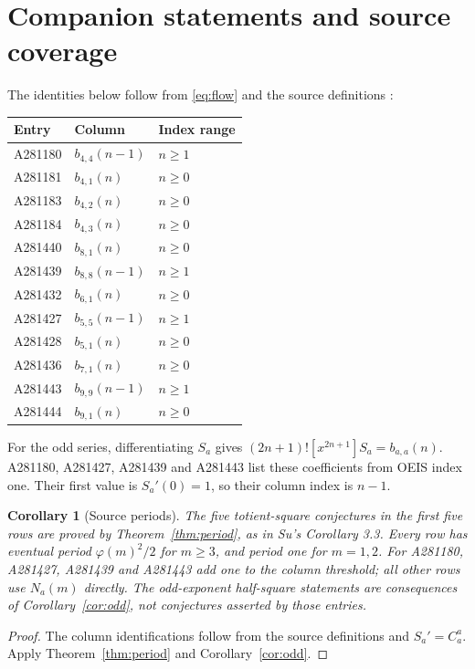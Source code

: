 \documentclass[11pt]{article}
\newtheorem{corollary}{Corollary}
\begin{document}
\section{Companion statements and source coverage}
The identities below follow from \eqref{eq:flow} and the source definitions
\cite{oeis180,oeis181,oeis183,oeis184,oeis440,oeiscompanions}:
\begin{center}
\begin{tabular}{lll}
\toprule
Entry & Column & Index range\\
\midrule
A281180 & $b_{4,4}(n-1)$ & $n\ge1$\\
A281181 & $b_{4,1}(n)$ & $n\ge0$\\
A281183 & $b_{4,2}(n)$ & $n\ge0$\\
A281184 & $b_{4,3}(n)$ & $n\ge0$\\
A281440 & $b_{8,1}(n)$ & $n\ge0$\\
A281439 & $b_{8,8}(n-1)$ & $n\ge1$\\
A281432 & $b_{6,1}(n)$ & $n\ge0$\\
A281427 & $b_{5,5}(n-1)$ & $n\ge1$\\
A281428 & $b_{5,1}(n)$ & $n\ge0$\\
A281436 & $b_{7,1}(n)$ & $n\ge0$\\
A281443 & $b_{9,9}(n-1)$ & $n\ge1$\\
A281444 & $b_{9,1}(n)$ & $n\ge0$\\
\bottomrule
\end{tabular}
\end{center}
For the odd series, differentiating $S_a$ gives
$(2n+1)![x^{2n+1}]S_a=b_{a,a}(n)$.
A281180, A281427, A281439 and A281443 list these coefficients from OEIS
index one. Their first value is $S_a'(0)=1$, so their column index is $n-1$.
\begin{corollary}[Source periods]\label{cor:sources}
The five totient-square conjectures in the first five rows are proved by
Theorem~\ref{thm:period}, as in Su's Corollary 3.3.
Every row has eventual period $\varphi(m)^2/2$ for $m\ge3$, and period one
for $m=1,2$. For A281180, A281427, A281439 and A281443 add one to the column
threshold; all other rows use $N_a(m)$ directly.
The odd-exponent half-square statements are consequences of
Corollary~\ref{cor:odd}, not conjectures asserted by those entries.
\end{corollary}
\begin{proof}
The column identifications follow from the source definitions and $S_a'=C_a^a$.
Apply Theorem~\ref{thm:period} and Corollary~\ref{cor:odd}.
\end{proof}
\end{document}
